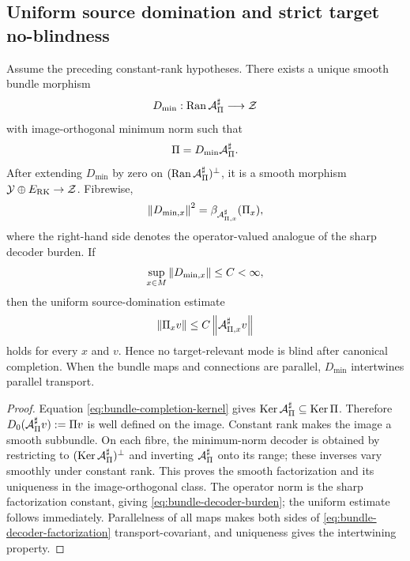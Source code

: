 \subsection{Uniform source domination and strict target no-blindness}

\begin{theorem}
\label{thm:bundle-source-domination}
Assume the preceding constant-rank hypotheses.  There exists a unique smooth bundle morphism
\[
D_{\min}:\operatorname{Ran}\mathcal A_\Pi^\sharp\longrightarrow\mathcal Z
\]
with image-orthogonal minimum norm such that
\begin{equation}
\Pi=D_{\min}\mathcal A_\Pi^\sharp.
\label{eq:bundle-decoder-factorization}
\end{equation}
After extending $D_{\min}$ by zero on $(\operatorname{Ran}\mathcal A_\Pi^\sharp)^\perp$, it is a smooth morphism $\mathcal Y\oplus E_{\mathrm{RK}}\to\mathcal Z$.  Fibrewise,
\begin{equation}
\left\lVert D_{\min,x}\right\rVert^2
=\beta_{\mathcal A_{\Pi,x}^\sharp}(\Pi_x),
\label{eq:bundle-decoder-burden}
\end{equation}
where the right-hand side denotes the operator-valued analogue of the sharp decoder burden.  If
\[
\sup_{x\in M}\left\lVert D_{\min,x}\right\rVert\le C<\infty,
\]
then the uniform source-domination estimate
\begin{equation}
\left\lVert\Pi_xv\right\rVert
\le C\left\lVert\mathcal A_{\Pi,x}^\sharp v\right\rVert
\label{eq:uniform-source-domination}
\end{equation}
holds for every $x$ and $v$.  Hence no target-relevant mode is blind after canonical completion.  When the bundle maps and connections are parallel, $D_{\min}$ intertwines parallel transport.
\end{theorem}

\begin{proof}
Equation \eqref{eq:bundle-completion-kernel} gives
$\operatorname{Ker}\mathcal A_\Pi^\sharp\subseteq\operatorname{Ker}\Pi$.  Therefore
$D_0(\mathcal A_\Pi^\sharp v):=\Pi v$ is well defined on the image.  Constant rank makes the image a smooth subbundle.  On each fibre, the minimum-norm decoder is obtained by restricting to $(\operatorname{Ker}\mathcal A_\Pi^\sharp)^\perp$ and inverting $\mathcal A_\Pi^\sharp$ onto its range; these inverses vary smoothly under constant rank.  This proves the smooth factorization and its uniqueness in the image-orthogonal class.  The operator norm is the sharp factorization constant, giving \eqref{eq:bundle-decoder-burden}; the uniform estimate follows immediately.  Parallelness of all maps makes both sides of \eqref{eq:bundle-decoder-factorization} transport-covariant, and uniqueness gives the intertwining property.
\end{proof}

